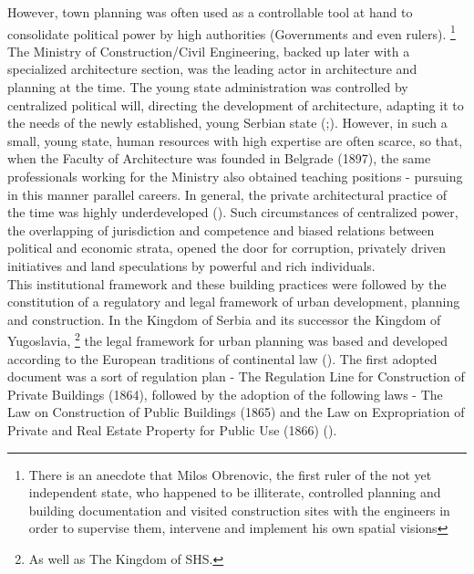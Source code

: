 \documentclass[11pt]{report}
\begin{document}
However, town planning was often used as a controllable tool at hand to consolidate political power by high authorities (Governments and even rulers). 
\footnote{There is an anecdote that Milos Obrenovic, the first ruler of the not yet independent state, who happened to be illiterate, controlled planning and building documentation and visited construction sites with the
engineers in order to supervise them, intervene and implement his own spatial visions}
The Ministry of Construction/Civil Engineering, backed up later with a specialized architecture section, was the leading actor in architecture and planning at the time. The young state administration was controlled by centralized political will, directing the development of architecture, adapting it to the needs of the newly established, young Serbian state (\href{Maksimovi}{\citealt{maksimovic_idejni_1978}};\href{ref}{\citealt{nedovicbudic_waves_2006}}).
However, in such a small, young state, human resources with high expertise are often  scarce,  so  that,  when  the  Faculty  of  Architecture  was  founded  in  Belgrade  (1897), the  same  professionals  working  for  the  Ministry  also  obtained  teaching  positions  - pursuing in this manner parallel careers. In general, the private architectural practice of the time was highly underdeveloped (\href{Mladjenovic}{\citealt{mladjenovic_novija_2010}}). Such circumstances of centralized power, the overlapping of jurisdiction and competence and biased relations between political and economic strata, opened the door for corruption, privately driven initiatives and land speculations by powerful and rich individuals.
\\

This institutional framework and these building practices were followed by the constitution of a regulatory and legal framework of urban development, planning and construction. In the Kingdom of Serbia and its successor the Kingdom of Yugoslavia,
\footnote{As well as The Kingdom of SHS.}
the legal framework for urban planning was based and developed according to the European traditions of continental law (\href{Zekovic}{\citealt{zekovic_historical_2016}}).
The first adopted document was a sort of regulation plan - The Regulation Line for Construction of Private Buildings (1864), followed by the adoption of the following laws - The Law on Construction of Public Buildings (1865) and the Law on Expropriation of Private and Real Estate Property for Public Use (1866) (\href{Nedovic}{\citealt{nedovicbudic_waves_2006}}).
\\
\end{document}

